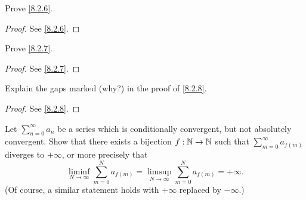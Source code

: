 \begin{ex}\label{ex:8.2.3}
  Prove \cref{8.2.6}.
\end{ex}

\begin{proof}
  See \cref{8.2.6}.
\end{proof}

\begin{ex}\label{ex:8.2.4}
  Prove \cref{8.2.7}.
\end{ex}

\begin{proof}
  See \cref{8.2.7}.
\end{proof}

\begin{ex}\label{ex:8.2.5}
  Explain the gaps marked (why?) in the proof of \cref{8.2.8}.
\end{ex}

\begin{proof}
  See \cref{8.2.8}.
\end{proof}

\begin{ex}\label{ex:8.2.6}
  Let \(\sum_{n = 0}^\infty a_n\) be a series which is conditionally convergent, but not absolutely convergent.
  Show that there exists a bijection \(f : \mathbb{N} \to \mathbb{N}\) such that \(\sum_{m = 0}^\infty a_{f(m)}\) diverges to \(+\infty\), or more precisely that
  \[
    \liminf_{N \to \infty} \sum_{m = 0}^N a_{f(m)} = \limsup_{N \to \infty} \sum_{m = 0}^N a_{f(m)} = +\infty.
  \]
  (Of course, a similar statement holds with \(+\infty\) replaced by \(-\infty\).)
\end{ex}

